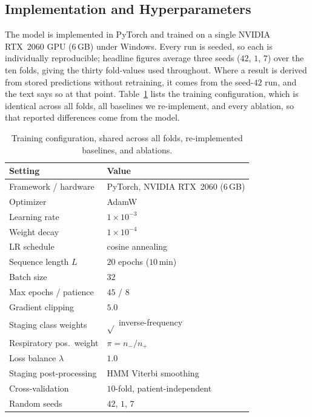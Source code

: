 \documentclass{ieeeaccess}
\begin{document}
\subsection{Implementation and Hyperparameters}
The model is implemented in PyTorch and trained on a single NVIDIA RTX~2060 GPU (6\,GB) under
Windows. Every run is seeded, so each is individually reproducible; headline figures
average three seeds ($42$, $1$, $7$) over the ten folds, giving the thirty fold-values used
throughout. Where a result is derived from stored predictions without retraining, it comes
from the seed-$42$ run, and the text says so at that point.
Table~\ref{tab:hyper} lists the training configuration, which is identical across all folds, all
baselines we re-implement, and every ablation, so that reported differences come from the model.

\begin{table}[t]
\caption{Training configuration, shared across all folds, re-implemented baselines, and ablations.}
\label{tab:hyper}
\centering
\small
\begin{tabular}{ll}
\toprule
Setting & Value \\
\midrule
Framework / hardware & PyTorch, NVIDIA RTX~2060 (6\,GB) \\
Optimizer & AdamW \\
Learning rate & $1\times10^{-3}$ \\
Weight decay & $1\times10^{-4}$ \\
LR schedule & cosine annealing \\
Sequence length $L$ & $20$ epochs ($10$\,min) \\
Batch size & $32$ \\
Max epochs / patience & $45$ / $8$ \\
Gradient clipping & $5.0$ \\
Staging class weights & $\sqrt{}$ inverse-frequency \\
Respiratory pos.\ weight & $\pi=n_-/n_+$ \\
Loss balance $\lambda$ & $1.0$ \\
Staging post-processing & HMM Viterbi smoothing \\
Cross-validation & $10$-fold, patient-independent \\
Random seeds & $42$, $1$, $7$ \\
\bottomrule
\end{tabular}
\end{table}
\end{document}

